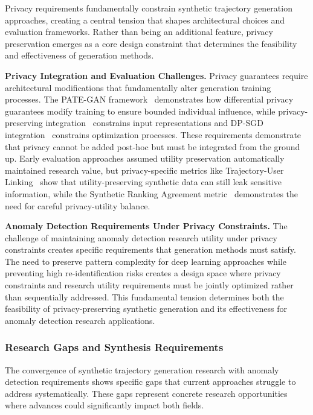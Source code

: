 \documentclass[runningheads]{llncs}
\begin{document}
Privacy requirements fundamentally constrain synthetic trajectory generation approaches, creating a central tension that shapes architectural choices and evaluation frameworks. Rather than being an additional feature, privacy preservation emerges as a core design constraint that determines the feasibility and effectiveness of generation methods.

\textbf{Privacy Integration and Evaluation Challenges.} Privacy guarantees require architectural modifications that fundamentally alter generation training processes. The PATE-GAN framework~\cite{jordonPATEGANGeneratingSynthetic2019} demonstrates how differential privacy guarantees modify training to ensure bounded individual influence, while privacy-preserving integration~\cite{raoCATSConditionalAdversarial2023} constrains input representations and DP-SGD integration~\cite{merhiSyntheticTrajectoryGeneration2024} constrains optimization processes. These requirements demonstrate that privacy cannot be added post-hoc but must be integrated from the ground up. Early evaluation approaches assumed utility preservation automatically maintained research value, but privacy-specific metrics like Trajectory-User Linking~\cite{raoCATSConditionalAdversarial2023} show that utility-preserving synthetic data can still leak sensitive information, while the Synthetic Ranking Agreement metric~\cite{jordonPATEGANGeneratingSynthetic2019} demonstrates the need for careful privacy-utility balance.

\textbf{Anomaly Detection Requirements Under Privacy Constraints.} The challenge of maintaining anomaly detection research utility under privacy constraints creates specific requirements that generation methods must satisfy. The need to preserve pattern complexity for deep learning approaches while preventing high re-identification risks creates a design space where privacy constraints and research utility requirements must be jointly optimized rather than sequentially addressed. This fundamental tension determines both the feasibility of privacy-preserving synthetic generation and its effectiveness for anomaly detection research applications.

\subsubsection{Research Gaps and Synthesis Requirements}

The convergence of synthetic trajectory generation research with anomaly detection requirements shows specific gaps that current approaches struggle to address systematically. These gaps represent concrete research opportunities where advances could significantly impact both fields.
\end{document}
